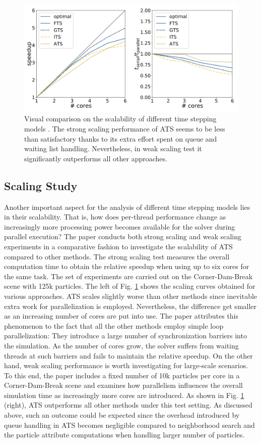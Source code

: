 \documentclass[
	11pt, 
	DIV10,
	ngerman,
	a4paper, 
	oneside, 
	headings=normal, 
	captions=tableheading,
	final, 
	numbers=noenddot
]{scrartcl}
\begin{document}
\begin{figure}[tb]
	\centering
	\includegraphics[scale=0.2]{images/8}
	\caption{\label{fig8} Visual comparison on the scalability of different time stepping models \cite{reinhardt2017fully}. The strong scaling performance of ATS seems to be less than satisfactory thanks to its extra effort spent on queue and waiting list handling. Nevertheless, in weak scaling test it significantly outperforms all other approaches.}
\end{figure}

\subsection{Scaling Study}
Another important aspect for the analysis of different time stepping models lies in their scalability. That is, how does per-thread performance change as increasingly more processing power becomes available for the solver during parallel execution? The paper conducts both strong scaling and weak scaling experiments in a comparative fashion to investigate the scalability of ATS compared to other methods. The strong scaling test measures the overall computation time to obtain the relative speedup when using up to six cores for the same task. The set of experiments are carried out on the Corner-Dam-Break scene with 125k particles. The left of Fig. \ref{fig8} shows the scaling curves obtained for various approaches. ATS scales slightly worse than other methods since inevitable extra work for parallelization is employed. Nevertheless, the difference get smaller as an increasing number of cores are put into use. The paper attributes this phenomenon to the fact that all the other methods employ simple loop parallelization: They introduce a large number of synchronization barriers into the simulation. As the number of cores grow, the solver suffers from waiting threads at such barriers and fails to maintain the relative speedup. On the other hand, weak scaling performance is worth investigating for large-scale scenarios. To this end, the paper includes a fixed number of 10k particles per core in a Corner-Dam-Break scene and examines how parallelism influences the overall simulation time as increasingly more cores are introduced. As shown in Fig. \ref{fig8} (right), ATS outperforms all other methods under this test setting. As discussed above, such an outcome could be expected since the overhead introduced by queue handling in ATS becomes negligible compared to neighborhood search and the particle attribute computations when handling larger number of particles.
\end{document}
